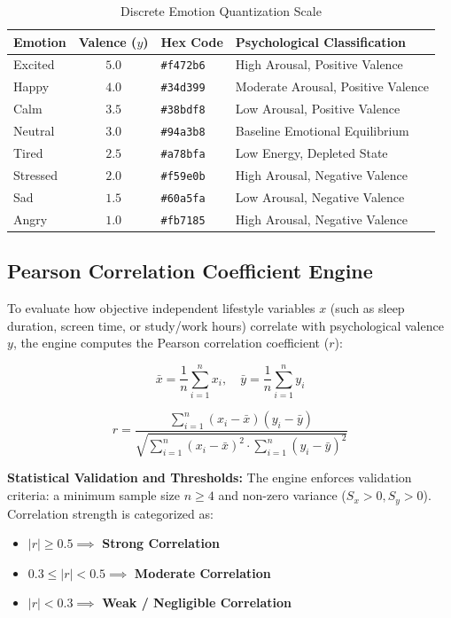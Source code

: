 \begin{table}[H]
\centering
\caption{Discrete Emotion Quantization Scale}
\begin{tabularx}{\textwidth}{l c l X}
\toprule
\textbf{Emotion} & \textbf{Valence ($y$)} & \textbf{Hex Code} & \textbf{Psychological Classification} \\
\midrule
Excited & $5.0$ & \texttt{\#f472b6} & High Arousal, Positive Valence \\
Happy   & $4.0$ & \texttt{\#34d399} & Moderate Arousal, Positive Valence \\
Calm    & $3.5$ & \texttt{\#38bdf8} & Low Arousal, Positive Valence \\
Neutral & $3.0$ & \texttt{\#94a3b8} & Baseline Emotional Equilibrium \\
Tired   & $2.5$ & \texttt{\#a78bfa} & Low Energy, Depleted State \\
Stressed& $2.0$ & \texttt{\#f59e0b} & High Arousal, Negative Valence \\
Sad     & $1.5$ & \texttt{\#60a5fa} & Low Arousal, Negative Valence \\
Angry   & $1.0$ & \texttt{\#fb7185} & High Arousal, Negative Valence \\
\bottomrule
\end{tabularx}
\end{table}

\subsection{Pearson Correlation Coefficient Engine}
To evaluate how objective independent lifestyle variables $x$ (such as sleep duration, screen time, or study/work hours) correlate with psychological valence $y$, the engine computes the Pearson correlation coefficient ($r$):

\begin{equation}
\bar{x} = \frac{1}{n} \sum_{i=1}^n x_i, \quad \bar{y} = \frac{1}{n} \sum_{i=1}^n y_i
\end{equation}

\begin{equation}
r = \frac{\sum_{i=1}^n (x_i - \bar{x})(y_i - \bar{y})}{\sqrt{\sum_{i=1}^n (x_i - \bar{x})^2 \cdot \sum_{i=1}^n (y_i - \bar{y})^2}}
\end{equation}

\textbf{Statistical Validation and Thresholds:}
The engine enforces validation criteria: a minimum sample size $n \ge 4$ and non-zero variance ($S_x > 0, S_y > 0$). Correlation strength is categorized as:
\begin{itemize}
  \item $|r| \ge 0.5 \implies$ \textbf{Strong Correlation}
  \item $0.3 \le |r| < 0.5 \implies$ \textbf{Moderate Correlation}
  \item $|r| < 0.3 \implies$ \textbf{Weak / Negligible Correlation}
\end{itemize}

